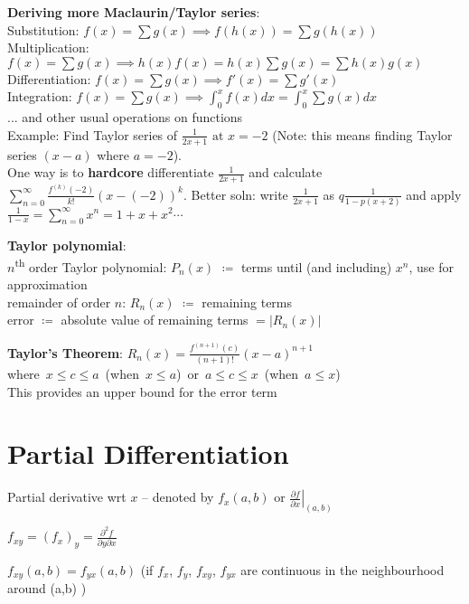 \documentclass[a4paper,landscape]{article}
\newcommand{\rntopic}[1]{\section*{#1}\vspace{-0.7em}}
\newcommand{\rnname}[1]{\textbf{#1}}
\begin{document}
\begin{multicols*}{3}
\begin{flatitemize}
\item \rnname{Deriving more Maclaurin/Taylor series}: \\
Substitution: $\displaystyle f(x)=\sum{g(x)} \implies f(h(x))=\sum{g(h(x))}$ \\
Multiplication: $\displaystyle f(x)=\sum{g(x)} \implies h(x)f(x)=h(x)\sum{g(x)}=\sum{h(x)g(x)}$ \\
Differentiation: $\displaystyle f(x)=\sum{g(x)} \implies f'(x)=\sum{g'(x)}$ \\
Integration: $\displaystyle f(x)=\sum{g(x)} \implies \int_0^x f(x) dx=\int_0^x \sum{g(x)} dx$ \\
... and other usual operations on functions \\
Example: Find Taylor series of $\frac{1}{2x+1} \text{ at } x = -2$ (Note: this means finding Taylor series $(x-a)$ where $a = -2$). \\
One way is to \textbf{hardcore} differentiate $\frac{1}{2x+1}$ and calculate $\displaystyle \sum_{n=0}^{\infty}\frac{f^{(k)}(-2)}{k!}(x-(-2))^{k}$.
Better soln: write $\frac{1}{2x+1}$ as $q\frac{1}{1-p(x+2)}$ and apply $\displaystyle \frac{1}{1-x} = \sum_{n=0}^{\infty} x^n = 1+x+x^2\cdots$

\needspace{2cm}\item \rnname{Taylor polynomial}:
\\ $n$\textsuperscript{th} order Taylor polynomial: $P_n(x)$ $\coloneqq$ terms until (and including) $x^n$, use for approximation
\\ remainder of order $n$: $R_n(x)$ $\coloneqq$ remaining terms
\\ error $\coloneqq$ absolute value of remaining terms $=\left|R_n(x)\right|$

\item \rnname{Taylor's Theorem}: $\displaystyle R_n\left(x\right) = \frac{f^{\left(n+1\right)}\left(c\right)}{\left(n+1\right)!}\left(x-a\right)^{n+1}$ \\ 
\mbox{where $x \leq c \leq a$ (when $x \leq a$) or $a \leq c \leq x$ (when $a \leq x$)} \\
\vspace{0.4em}
This provides an upper bound for the error term

\end{flatitemize}

\rntopic{Partial Differentiation}

\begin{flatitemize}

\item Partial derivative wrt $x$ -- denoted by $\displaystyle f_x(a,b)$ or $\displaystyle\left.\frac{\partial f}{\partial x} \right| _{(a,b)}$
\item $f_{xy}=\left(f_x\right)_y = \frac{\partial^2 f}{\partial y \partial x}$ 
\item $f_{xy}(a,b)=f_{yx}(a,b)$ (if $f_x$, $f_y$, $f_{xy}$, $f_{yx}$ are continuous in the neighbourhood around (a,b) )


\end{flatitemize}
\end{multicols*}
\end{document}

